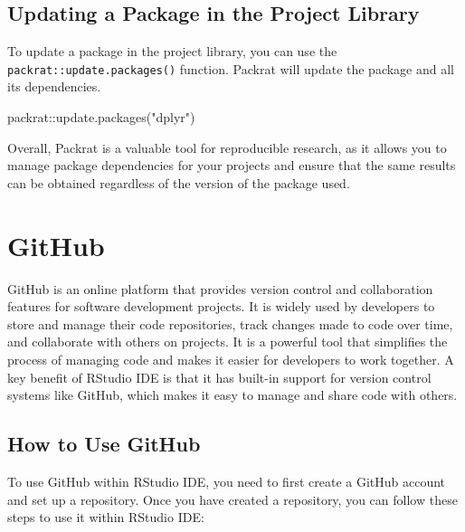 \documentclass[
]{book}
\newenvironment{Shaded}{\begin{snugshade}}{\end{snugshade}}
\newcommand{\FunctionTok}[1]{\textcolor[rgb]{0.00,0.00,0.00}{#1}}
\newcommand{\NormalTok}[1]{#1}
\newcommand{\SpecialCharTok}[1]{\textcolor[rgb]{0.00,0.00,0.00}{#1}}
\newcommand{\StringTok}[1]{\textcolor[rgb]{0.31,0.60,0.02}{#1}}
\begin{document}
\hypertarget{updating-a-package-in-the-project-library}{%
\subsection*{Updating a Package in the Project Library}\label{updating-a-package-in-the-project-library}}

To update a package in the project library, you can use the \texttt{packrat::update.packages()} function. Packrat will update the package and all its dependencies.

\begin{Shaded}
\begin{Highlighting}[]
\NormalTok{packrat}\SpecialCharTok{::}\FunctionTok{update.packages}\NormalTok{(}\StringTok{"dplyr"}\NormalTok{)}
\end{Highlighting}
\end{Shaded}

Overall, Packrat is a valuable tool for reproducible research, as it allows you to manage package dependencies for your projects and ensure that the same results can be obtained regardless of the version of the package used.

\hypertarget{github}{%
\section{GitHub}\label{github}}

GitHub is an online platform that provides version control and collaboration features for software development projects. It is widely used by developers to store and manage their code repositories, track changes made to code over time, and collaborate with others on projects. It is a powerful tool that simplifies the process of managing code and makes it easier for developers to work together. A key benefit of RStudio IDE is that it has built-in support for version control systems like GitHub, which makes it easy to manage and share code with others.

\hypertarget{how-to-use-github}{%
\subsection*{How to Use GitHub}\label{how-to-use-github}}

To use GitHub within RStudio IDE, you need to first create a GitHub account and set up a repository. Once you have created a repository, you can follow these steps to use it within RStudio IDE:
\end{document}
